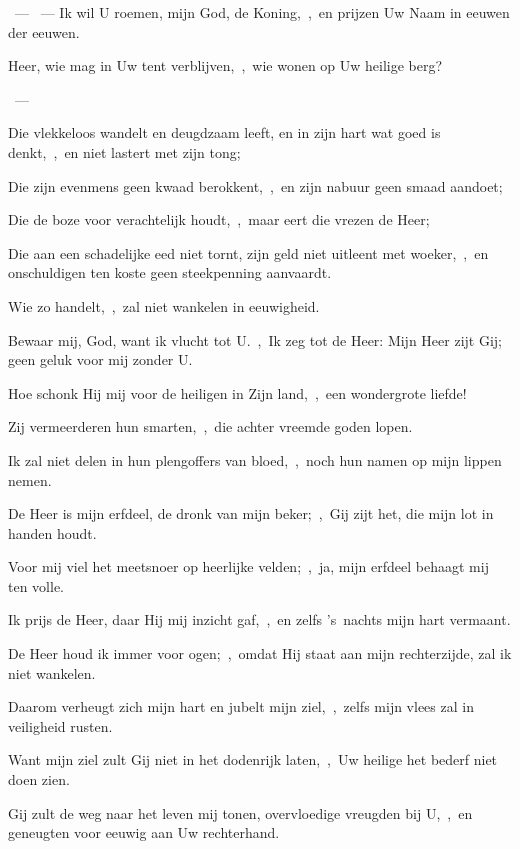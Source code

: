 \documentclass[12pt,twoside,a5paper]{article}
\begin{document}
\begin{halfparskip}
  ~--- ~---  Ik wil U roemen, mijn God, de Koning,~\sep\ en prijzen Uw Naam in eeuwen der eeuwen.
\end{halfparskip}


\begin{halfparskip}
   Heer, wie mag in Uw tent verblijven,~\sep\ wie wonen op Uw heilige berg?

  ~--- 

  Die vlekkeloos wandelt en deugdzaam leeft, en in zijn hart wat goed is denkt,~\sep\ en niet lastert met zijn tong;

  Die zijn evenmens geen kwaad berokkent,~\sep\ en zijn nabuur geen smaad aandoet;

  Die de boze voor verachtelijk houdt,~\sep\ maar eert die vrezen de Heer;

  Die aan een schadelijke eed niet tornt, zijn geld niet uitleent met woeker,~\sep\ en onschuldigen ten koste geen steekpenning aanvaardt.

  Wie zo handelt,~\sep\ zal niet wankelen in eeuwigheid.
\end{halfparskip}

\begin{halfparskip}
   Bewaar mij, God, want ik vlucht tot U.~\sep\ Ik zeg tot de Heer: Mijn Heer zijt Gij; geen geluk voor mij zonder U.

  Hoe schonk Hij mij voor de heiligen in Zijn land,~\sep\ een wondergrote liefde!

  Zij vermeerderen hun smarten,~\sep\ die achter vreemde goden lopen.

  Ik zal niet delen in hun plengoffers van bloed,~\sep\ noch hun namen op mijn lippen nemen.

  De Heer is mijn erfdeel, de dronk van mijn beker;~\sep\ Gij zijt het, die mijn lot in handen houdt.

  Voor mij viel het meetsnoer op heerlijke velden;~\sep\ ja, mijn erfdeel behaagt mij ten volle.

  Ik prijs de Heer, daar Hij mij inzicht gaf,~\sep\ en zelfs 's~nachts mijn hart vermaant.

  De Heer houd ik immer voor ogen;~\sep\ omdat Hij staat aan mijn rechterzijde, zal ik niet wankelen.

  Daarom verheugt zich mijn hart en jubelt mijn ziel,~\sep\ zelfs mijn vlees zal in veiligheid rusten.

  Want mijn ziel zult Gij niet in het dodenrijk laten,~\sep\ Uw heilige het bederf niet doen zien.

  Gij zult de weg naar het leven mij tonen, overvloedige vreugden bij U,~\sep\ en geneugten voor eeuwig aan Uw rechterhand.
\end{halfparskip}
\end{document}
